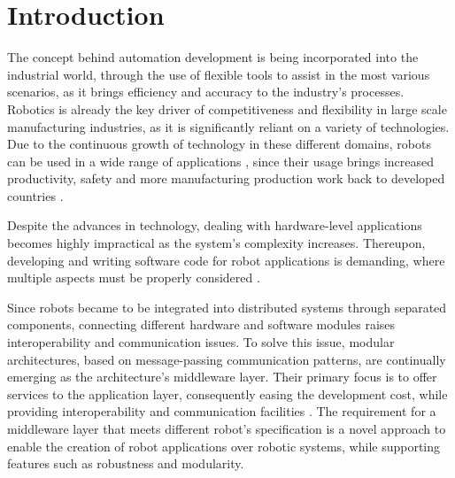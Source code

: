 \chapter{Introduction}\label{c:intro}

The concept behind automation development is being incorporated into the industrial world, through the use of flexible tools to assist in the most various scenarios, as it brings efficiency and accuracy to the industry's processes. Robotics is already the key driver of competitiveness and flexibility in large scale manufacturing industries, as it is significantly reliant on a variety of technologies. Due to the continuous growth of technology in these different domains, robots can be used in a wide range of applications \cite{mohamed2008middleware}, since their usage brings increased productivity, safety and more manufacturing production work back to developed countries \cite{robots-importance, craig2005introduction}.

Despite the advances in technology, dealing with hardware-level applications becomes highly impractical as the system's complexity increases. Thereupon, developing and writing software code for robot applications is demanding, where multiple aspects must be properly considered \cite{intro-ros}. 

Since robots became to be integrated into distributed systems through separated components, connecting different hardware and software modules raises interoperability and communication issues. To solve this issue, modular architectures, based on message-passing communication patterns, are continually emerging as the architecture's middleware layer. Their primary focus is to offer services to the application layer, consequently easing the development cost, while providing interoperability and communication facilities \cite{mohamed2008middleware, maruyama2016exploring}. The requirement for a middleware layer that meets different robot's specification is a novel approach to enable the creation of robot applications over robotic systems, while supporting features such as robustness and modularity. 


